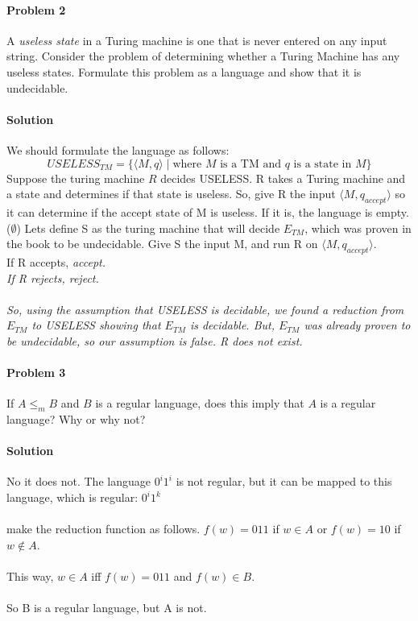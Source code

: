 \documentclass{article}
\begin{document}
\paragraph{Problem 2} A {\em useless state} in a Turing machine
is one that is never entered on any input string.  Consider the 
problem of determining whether a Turing Machine has any useless 
states.  Formulate this problem as a language and show that it 
is undecidable.

\paragraph{Solution} We should formulate the language as follows:
\[USELESS_{TM} = \{ \langle M,q \rangle \;|\; \mbox{where $M$ is a TM and $q$ is a state in $M$} \}\]
\noindent Suppose the turing machine $R$ decides USELESS. R takes a Turing machine and a state and determines if that state is useless. So, give R the input $\langle M, q_{accept}\rangle$ so it can determine if the accept state of M is useless. If it is, the language is empty. ($\emptyset$) Lets define S as the turing machine that will decide $E_{TM}$, which was proven in the book to be undecidable. Give S the input M, and run R on $\langle M, q_{accept}\rangle$.
\\If R accepts, \em accept.\em
\\If R rejects, \em reject. \em
\\\\So, using the assumption that USELESS is decidable, we found a reduction from $E_{TM}$ to USELESS showing that $E_{TM}$ is decidable. But, $E_{TM}$ was already proven to be undecidable, so our assumption is false. R does not exist.

\paragraph{Problem 3} If $A \leq_m B$ and $B$ is a regular language,
does this imply that $A$ is a regular language? Why or why not?
\paragraph{Solution} No it does not. The language $0^i1^i$ is not regular, but it can be mapped to this language, which is regular: $0^i1^k$
\\\\make the reduction function as follows. $f(w) = 011$ if $w \in A$ or $f(w) = 10$ if $w \notin A$.
\\\\This way, $w \in A$ iff $f(w) = 011$ and $f(w) \in B$.
\\\\So B is a regular language, but A is not.
\end{document}
